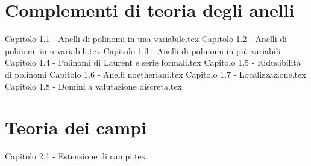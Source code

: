 \documentclass{article}
\begin{document}
\setcounter{page}{1}
\section{Complementi di teoria degli anelli}
{Capitolo 1.1 - Anelli di polinomi in una variabile.tex}
{Capitolo 1.2 - Anelli di polinomi in n variabili.tex}
{Capitolo 1.3 - Anelli di polinomi in più variabili}
{Capitolo 1.4 - Polinomi di Laurent e serie formali.tex}
{Capitolo 1.5 - Riducibilità di polinomi}
{Capitolo 1.6 - Anelli noetheriani.tex}
{Capitolo 1.7 - Localizzazione.tex}
{Capitolo 1.8 - Domini a valutazione discreta.tex}

\section{Teoria dei campi}
{Capitolo 2.1 - Estensione di campi.tex}
\end{document}
